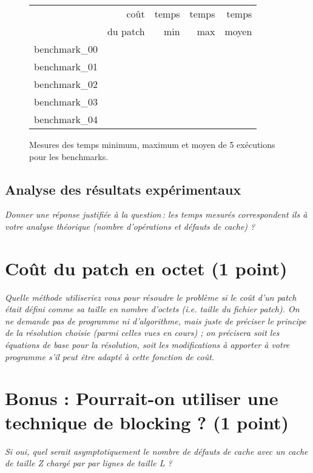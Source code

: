 \documentclass[a4paper,10pt,french]{article}
\newcounter{question}%
\begin{document}
    \begin{figure}[h]
      \begin{center}
        \begin{tabular}{|l||r||r|r|r||}
          \hline
          \hline
            & coût         & temps     & temps   & temps \\
            & du patch     & min       & max     & moyen \\
          \hline
          \hline
            benchmark\_00 &      &     &     &     \\
          \hline
            benchmark\_01 &      &     &     &     \\
          \hline
            benchmark\_02 &      &     &     &     \\
          \hline
            benchmark\_03 &      &     &     &     \\
          \hline
            benchmark\_04 &      &     &     &     \\
          \hline
          \hline
        \end{tabular}
        \caption{Mesures des temps minimum, maximum et moyen de 5 exécutions pour les benchmarks.}
        \label{table-temps}
      \end{center}
    \end{figure}

\subsection{Analyse des résultats expérimentaux}
{\em Donner  une réponse justifiée  à la question\,:
              les  temps mesurés correspondent ils  à votre analyse théorique (nombre d’opérations et défauts de cache) ?
}

\section{Coût du patch en octet (1 point)}
  {\em Quelle méthode utiliseriez vous pour résoudre le problème si le coût d’un patch était défini comme
sa taille en nombre d’octets (i.e. taille du fichier patch).
On ne demande pas de programme ni d’algorithme, mais juste de préciser le principe de la résolution
choisie (parmi celles vues en cours) ; on précisera soit les équations de base pour la résolution, soit
les modifications à apporter à votre programme s’il peut être adapté à cette fonction de coût.
  }
\section{Bonus : Pourrait-on utiliser une technique de blocking ? (1 point)}
{\em
Si oui, quel serait asymptotiquement le nombre de défauts de
cache avec un cache de taille Z chargé par par lignes de taille L ?
}
\end{document}
